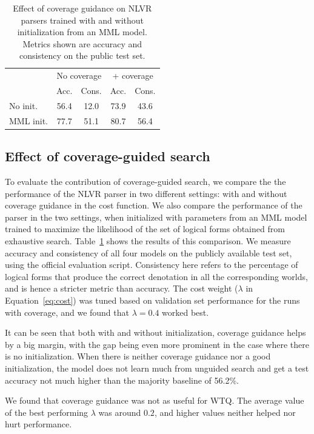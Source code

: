 \begin{table}
    \centering
    \begin{tabular}{lcccc}
        \toprule
        \multicolumn{1}{c}{}& \multicolumn{2}{c}{No coverage} & \multicolumn{2}{c}{+ coverage} \\
        \multicolumn{1}{c}{}& Acc. & Cons. & Acc. & Cons. \\
        \midrule
         No init.  & 56.4 & 12.0 & 73.9 & 43.6 \\
         MML init. & 77.7 & 51.1 & 80.7 & 56.4 \\
         \bottomrule
    \end{tabular}
    \caption{Effect of coverage guidance on NLVR parsers trained with and without initialization from an MML model. Metrics shown are accuracy and consistency on the public test set.}
    \label{tab:coverage_guidance}
\end{table}
\subsection{Effect of coverage-guided search} \label{sec:results_coverage}
To evaluate the contribution of coverage-guided search, we compare the the performance of the NLVR parser in two different settings: with and without coverage guidance in the cost function. We also compare the performance of the parser in the two settings, when initialized with parameters from an MML model trained to maximize the likelihood of the set of logical forms obtained from exhaustive search. Table~\ref{tab:coverage_guidance} shows the results of this comparison. We measure accuracy and consistency of all four models on the publicly available test set, using the official evaluation script. Consistency here refers to the percentage of logical forms that produce the correct denotation in all the corresponding worlds, and is hence a stricter metric than accuracy. The cost weight ($\lambda$ in Equation~\ref{eq:cost}) was tuned based on validation set performance for the runs with coverage, and we found that $\lambda = 0.4$ worked best.

It can be seen that both with and without initialization, coverage guidance helps by a big margin, with the gap being even more prominent in the case where there is no initialization. When there is neither coverage guidance nor a good initialization, the model does not learn much from unguided search and get a test accuracy not much higher than the majority baseline of 56.2\%.

We found that coverage guidance was not as useful for WTQ. The average value of the best performing $\lambda$ was around $0.2$, and higher values neither helped nor hurt performance.  

